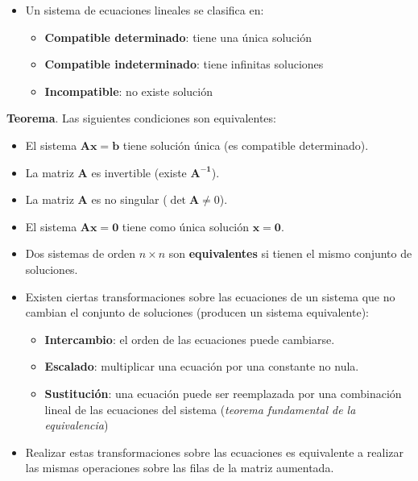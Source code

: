 \documentclass[]{book}
\providecommand{\tightlist}{%
  \setlength{\itemsep}{0pt}\setlength{\parskip}{0pt}}
\begin{document}
\begin{itemize}
\item
  Un sistema de ecuaciones lineales se clasifica en:

  \begin{itemize}
  \tightlist
  \item
    \textbf{Compatible determinado}: tiene una única solución
  \item
    \textbf{Compatible indeterminado}: tiene infinitas soluciones
  \item
    \textbf{Incompatible}: no existe solución
  \end{itemize}
\end{itemize}

\textbf{Teorema}. Las siguientes condiciones son equivalentes:

\begin{itemize}
\item
  El sistema \(\mathbf{Ax=b}\) tiene solución única (es compatible determinado).
\item
  La matriz \(\mathbf{A}\) es invertible (existe \(\mathbf{A^{-1}}\)).
\item
  La matriz \(\mathbf{A}\) es no singular (\(\det \mathbf{A} \neq 0\)).
\item
  El sistema \(\mathbf{Ax=0}\) tiene como única solución \(\mathbf{x=0}\).
\item
  Dos sistemas de orden \(n \times n\) son \textbf{equivalentes} si tienen el mismo conjunto de soluciones.
\item
  Existen ciertas transformaciones sobre las ecuaciones de un sistema que no cambian el conjunto de soluciones (producen un sistema equivalente):

  \begin{itemize}
  \tightlist
  \item
    \textbf{Intercambio}: el orden de las ecuaciones puede cambiarse.
  \item
    \textbf{Escalado}: multiplicar una ecuación por una constante no nula.
  \item
    \textbf{Sustitución}: una ecuación puede ser reemplazada por una combinación lineal de las ecuaciones del sistema (\emph{teorema fundamental de la equivalencia})
  \end{itemize}
\item
  Realizar estas transformaciones sobre las ecuaciones es equivalente a realizar las mismas operaciones sobre las filas de la matriz aumentada.
\end{itemize}
\end{document}
